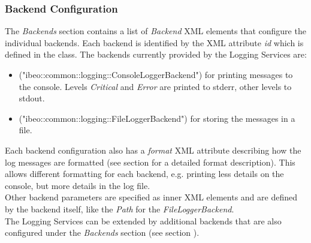 \subsubsection{Backend Configuration}
The \textit{Backends} section contains a list of \textit{Backend} XML elements that configure the individual backends. Each backend is identified by the XML attribute \textit{id} which is defined in the  class. The backends currently provided by the Logging Services are:
\begin{itemize}
	\item {} ("ibeo::common::logging::ConsoleLoggerBackend") for printing messages to the console. Levels \textit{Critical} and \textit{Error} are printed to stderr, other levels to stdout.
	\item {} ("ibeo::common::logging::FileLoggerBackend") for storing the messages in a file.
\end{itemize}
Each backend configuration also has a \textit{format} XML attribute describing how the log messages are formatted (see section  for a detailed format description). This allows different formatting for each backend, e.g. printing less details on the console, but more details in the log file.\\
Other backend parameters are specified as inner XML elements and are defined by the backend itself, like the \textit{Path} for the \textit{FileLoggerBackend}.\\
The Logging Services can be extended by additional backends that are also configured under the \textit{Backends} section (see section ).

